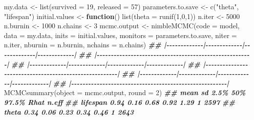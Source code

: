 \documentclass[
  12pt,
]{krantz}
\newenvironment{Shaded}{\begin{snugshade}}{\end{snugshade}}
\newcommand{\AttributeTok}[1]{\textcolor[rgb]{0.77,0.63,0.00}{#1}}
\newcommand{\ControlFlowTok}[1]{\textcolor[rgb]{0.13,0.29,0.53}{\textbf{#1}}}
\newcommand{\DecValTok}[1]{\textcolor[rgb]{0.00,0.00,0.81}{#1}}
\newcommand{\DocumentationTok}[1]{\textcolor[rgb]{0.56,0.35,0.01}{\textbf{\textit{#1}}}}
\newcommand{\FunctionTok}[1]{\textcolor[rgb]{0.00,0.00,0.00}{#1}}
\newcommand{\NormalTok}[1]{#1}
\newcommand{\OtherTok}[1]{\textcolor[rgb]{0.56,0.35,0.01}{#1}}
\newcommand{\StringTok}[1]{\textcolor[rgb]{0.31,0.60,0.02}{#1}}
\begin{document}
\begin{Shaded}
\begin{Highlighting}[]
\NormalTok{my.data }\OtherTok{\textless{}{-}} \FunctionTok{list}\NormalTok{(}\AttributeTok{survived =} \DecValTok{19}\NormalTok{, }\AttributeTok{released =} \DecValTok{57}\NormalTok{)}
\NormalTok{parameters.to.save }\OtherTok{\textless{}{-}} \FunctionTok{c}\NormalTok{(}\StringTok{"theta"}\NormalTok{, }\StringTok{"lifespan"}\NormalTok{)}
\NormalTok{initial.values }\OtherTok{\textless{}{-}} \ControlFlowTok{function}\NormalTok{() }\FunctionTok{list}\NormalTok{(}\AttributeTok{theta =} \FunctionTok{runif}\NormalTok{(}\DecValTok{1}\NormalTok{,}\DecValTok{0}\NormalTok{,}\DecValTok{1}\NormalTok{))}
\NormalTok{n.iter }\OtherTok{\textless{}{-}} \DecValTok{5000}
\NormalTok{n.burnin }\OtherTok{\textless{}{-}} \DecValTok{1000}
\NormalTok{n.chains }\OtherTok{\textless{}{-}} \DecValTok{3}
\NormalTok{mcmc.output }\OtherTok{\textless{}{-}} \FunctionTok{nimbleMCMC}\NormalTok{(}\AttributeTok{code =}\NormalTok{ model,}
                          \AttributeTok{data =}\NormalTok{ my.data,}
                          \AttributeTok{inits =}\NormalTok{ initial.values,}
                          \AttributeTok{monitors =}\NormalTok{ parameters.to.save,}
                          \AttributeTok{niter =}\NormalTok{ n.iter,}
                          \AttributeTok{nburnin =}\NormalTok{ n.burnin,}
                          \AttributeTok{nchains =}\NormalTok{ n.chains)}
\DocumentationTok{\#\# |{-}{-}{-}{-}{-}{-}{-}{-}{-}{-}{-}{-}{-}|{-}{-}{-}{-}{-}{-}{-}{-}{-}{-}{-}{-}{-}|{-}{-}{-}{-}{-}{-}{-}{-}{-}{-}{-}{-}{-}|{-}{-}{-}{-}{-}{-}{-}{-}{-}{-}{-}{-}{-}|}
\DocumentationTok{\#\# |{-}{-}{-}{-}{-}{-}{-}{-}{-}{-}{-}{-}{-}{-}{-}{-}{-}{-}{-}{-}{-}{-}{-}{-}{-}{-}{-}{-}{-}{-}{-}{-}{-}{-}{-}{-}{-}{-}{-}{-}{-}{-}{-}{-}{-}{-}{-}{-}{-}{-}{-}{-}{-}{-}{-}|}
\DocumentationTok{\#\# |{-}{-}{-}{-}{-}{-}{-}{-}{-}{-}{-}{-}{-}|{-}{-}{-}{-}{-}{-}{-}{-}{-}{-}{-}{-}{-}|{-}{-}{-}{-}{-}{-}{-}{-}{-}{-}{-}{-}{-}|{-}{-}{-}{-}{-}{-}{-}{-}{-}{-}{-}{-}{-}|}
\DocumentationTok{\#\# |{-}{-}{-}{-}{-}{-}{-}{-}{-}{-}{-}{-}{-}{-}{-}{-}{-}{-}{-}{-}{-}{-}{-}{-}{-}{-}{-}{-}{-}{-}{-}{-}{-}{-}{-}{-}{-}{-}{-}{-}{-}{-}{-}{-}{-}{-}{-}{-}{-}{-}{-}{-}{-}{-}{-}|}
\DocumentationTok{\#\# |{-}{-}{-}{-}{-}{-}{-}{-}{-}{-}{-}{-}{-}|{-}{-}{-}{-}{-}{-}{-}{-}{-}{-}{-}{-}{-}|{-}{-}{-}{-}{-}{-}{-}{-}{-}{-}{-}{-}{-}|{-}{-}{-}{-}{-}{-}{-}{-}{-}{-}{-}{-}{-}|}
\DocumentationTok{\#\# |{-}{-}{-}{-}{-}{-}{-}{-}{-}{-}{-}{-}{-}{-}{-}{-}{-}{-}{-}{-}{-}{-}{-}{-}{-}{-}{-}{-}{-}{-}{-}{-}{-}{-}{-}{-}{-}{-}{-}{-}{-}{-}{-}{-}{-}{-}{-}{-}{-}{-}{-}{-}{-}{-}{-}|}
\FunctionTok{MCMCsummary}\NormalTok{(}\AttributeTok{object =}\NormalTok{ mcmc.output, }\AttributeTok{round =} \DecValTok{2}\NormalTok{)}
\DocumentationTok{\#\#          mean   sd 2.5\%  50\% 97.5\% Rhat n.eff}
\DocumentationTok{\#\# lifespan 0.94 0.16 0.68 0.92  1.29    1  2597}
\DocumentationTok{\#\# theta    0.34 0.06 0.23 0.34  0.46    1  2643}
\end{Highlighting}
\end{Shaded}
\end{document}
